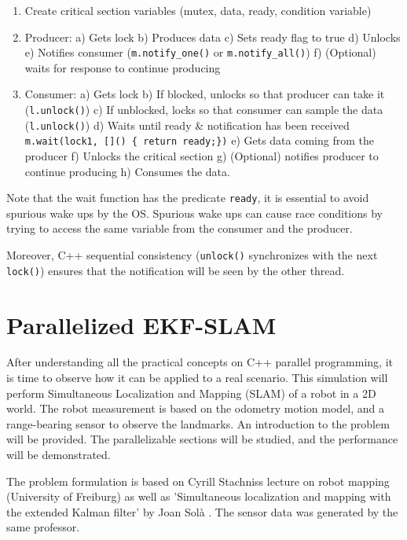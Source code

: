 \documentclass[conference]{IEEEtran}
\begin{document}
\begin{enumerate}
\item Create critical section variables (mutex, data, ready, condition variable)
\item Producer: a) Gets lock b) Produces data c) Sets ready flag to true d) Unlocks e) Notifies consumer (\verb|m.notify_one()| or \verb|m.notify_all()|) f) (Optional) waits for response to continue producing
\item Consumer: a) Gets lock b) If blocked, unlocks so that producer can take it (\verb|l.unlock()|) c) If unblocked, locks so that consumer can sample the data (\verb|l.unlock()|) d) Waits until ready & notification has been received \verb|m.wait(lock1, []() { return ready;})| e) Gets data coming from the producer f) Unlocks the critical section  g) (Optional) notifies producer to continue producing h) Consumes the data.
\end{enumerate}


Note that the wait function has the predicate \verb|ready|, it is essential to avoid spurious wake ups by the OS. Spurious wake ups can cause race conditions by trying to access the same variable from the consumer and the producer.

Moreover, C++ sequential consistency (\verb|unlock()| synchronizes with the next \verb|lock()|) ensures that the notification will be seen by the other thread.

\section{Parallelized EKF-SLAM}

After understanding all the practical concepts on C++ parallel programming, it is time to observe how it can be applied to a real scenario. This simulation will perform Simultaneous Localization and Mapping (SLAM) of a robot in a 2D world. The robot measurement is based on the odometry motion model, and a range-bearing sensor to observe the landmarks. An introduction to the problem will be provided. The parallelizable sections will be studied, and the performance will be demonstrated.

The problem formulation is based on Cyrill Stachniss lecture on robot mapping \cite{RobotMappingCourse} (University of Freiburg) as well as 'Simultaneous localization and mapping with the extended Kalman filter' by Joan Solà \cite{Course}. The sensor data was generated by the same professor.
\end{document}
